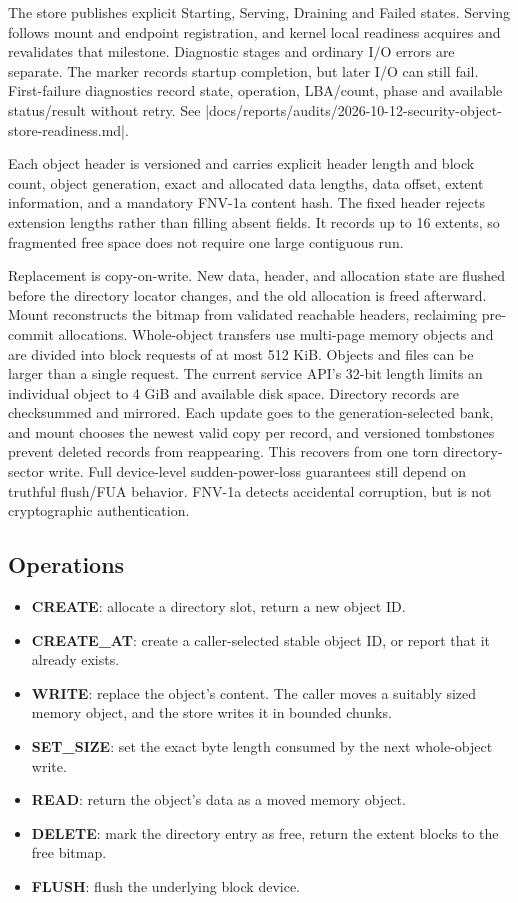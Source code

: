 The store publishes explicit Starting, Serving, Draining and Failed states.
Serving follows mount and endpoint registration, and kernel local readiness
acquires and revalidates that milestone. Diagnostic stages and ordinary I/O
errors are separate. The marker records startup completion, but later I/O can still fail.
First-failure diagnostics record state, operation, LBA/count, phase and
available status/result without retry. See
\repofile|docs/reports/audits/2026-10-12-security-object-store-readiness.md|.

Each object header is versioned and carries explicit header length and block
count, object generation, exact and allocated data lengths, data offset,
extent information, and a mandatory FNV-1a content hash. The fixed header
rejects extension lengths rather than filling absent fields. It records up to 16
extents, so fragmented free space does not require one large contiguous run.

Replacement is copy-on-write. New data, header, and allocation state are
flushed before the directory locator changes, and the old allocation is freed
afterward. Mount reconstructs the bitmap from validated reachable headers,
reclaiming pre-commit allocations. Whole-object transfers use multi-page
memory objects and are divided into block requests of at most 512 KiB. Objects
and files can be larger than a single request. The current service API's
32-bit length limits an individual object to 4 GiB and available disk space.
Directory records are checksummed and mirrored. Each update goes to the
generation-selected bank, and mount chooses the newest valid copy per record, and
versioned tombstones prevent deleted records from reappearing. This recovers
from one torn directory-sector write. Full device-level sudden-power-loss
guarantees still depend on truthful flush/FUA behavior. FNV-1a detects
accidental corruption, but is not cryptographic authentication.

\subsection{Operations}

\begin{itemize}
    \item \textbf{CREATE}: allocate a directory slot, return a new object ID.
    \item \textbf{CREATE\_AT}: create a caller-selected stable object ID, or
        report that it already exists.
    \item \textbf{WRITE}: replace the object's content. The caller moves a
        suitably sized memory object, and the store writes it in bounded chunks.
    \item \textbf{SET\_SIZE}: set the exact byte length consumed by the next
        whole-object write.
    \item \textbf{READ}: return the object's data as a moved memory object.
    \item \textbf{DELETE}: mark the directory entry as free, return the
        extent blocks to the free bitmap.
    \item \textbf{FLUSH}: flush the underlying block device.
\end{itemize}

